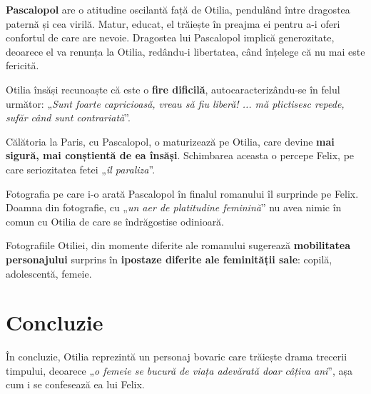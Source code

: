 \documentclass{article}
\newcommand{\qu}[1]{„\emph{#1}”}
\begin{document}
\textbf{Pascalopol} are o atitudine oscilantă față de Otilia, pendulând între dragostea paternă și cea virilă. Matur, educat, el trăiește în preajma ei pentru a-i oferi confortul de care are nevoie. Dragostea lui Pascalopol implică generozitate, deoarece el va renunța la Otilia, redându-i libertatea, când înțelege că nu mai este fericită.

Otilia însăși recunoaște că este o \textbf{fire dificilă}, autocaracterizându-se în felul următor: \qu{Sunt foarte capricioasă, vreau să fiu liberă! ... mă plictisesc repede, sufăr când sunt contrariată}.

Călătoria la Paris, cu Pascalopol, o maturizează pe Otilia, care devine \textbf{mai sigură, mai conștientă de ea însăși}. Schimbarea aceasta o percepe Felix, pe care seriozitatea fetei \qu{îl paraliza}.

Fotografia pe care i-o arată Pascalopol în finalul romanului îl surprinde pe Felix. Doamna din fotografie, cu \qu{un aer de platitudine feminină} nu avea nimic în comun cu Otilia de care se îndrăgostise odinioară.

Fotografiile Otiliei, din momente diferite ale romanului sugerează \textbf{mobilitatea personajului} surprins în \textbf{ipostaze diferite ale feminității sale}: copilă, adolescentă, femeie.
\section{Concluzie}
În concluzie, Otilia reprezintă un personaj bovaric care trăiește drama trecerii timpului, deoarece \qu{o femeie se bucură de viața adevărată doar câțiva ani}, așa cum i se confesează ea lui Felix.
\end{document}

